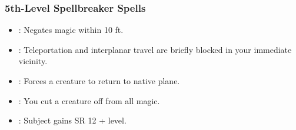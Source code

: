 \subsubsection{5th-Level Spellbreaker Spells}
\begin{itemize}
  \item {}: Negates magic within 10 ft.
  \item {}: Teleportation and interplanar travel are briefly blocked in your immediate vicinity.
  \item {}: Forces a creature to return to native plane.
  \item {}: You cut a creature off from all magic.
  \item {}: Subject gains SR 12 + level.
\end{itemize}


% 

